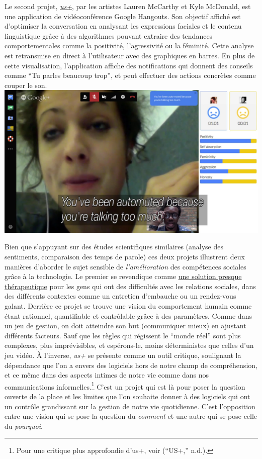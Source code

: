 \documentclass[]{article}
\begin{document}
Le second projet, \href{http://lauren-mccarthy.com/us}{\emph{us+}}, par
les artistes Lauren McCarthy et Kyle McDonald, est une application de
vidéoconférence Google Hangouts. Son objectif affiché est d'optimiser la
conversation en analysant les expressions faciales et le contenu
linguistique grâce à des algorithmes pouvant extraire des tendances
comportementales comme la positivité, l'agressivité ou la féminité.
Cette analyse est retransmise en direct à l'utilisateur avec des
graphiques en barres. En plus de cette visualisation, l'application
affiche des notifications qui donnent des conseils comme ``Tu parles
beaucoup trop'', et peut effectuer des actions concrètes comme couper le
son.
\includegraphics{./tex2pdf.15892/8a1224117ed91d8015226843bec5d97f13330fe4.jpg}

Bien que s'appuyant sur des études scientifiques similaires (analyse des
sentiments, comparaison des temps de parole) ces deux projets illustrent
deux manières d'aborder le sujet sensible de \emph{l'amélioration} des
compétences sociales grâce à la technologie. Le premier se revendique
comme \href{(https://www.youtube.com/watch?v=l3ztu9shfMg)}{une solution
presque thérapeutique} pour les gens qui ont des difficultés avec les
relations sociales, dans des différents contextes comme un entretien
d'embauche ou un rendez-vous galant. Derrière ce projet se trouve une
vision du comportement humain comme étant rationnel, quantifiable et
contrôlable grâce à des paramètres. Comme dans un jeu de gestion, on
doit atteindre son but (communiquer mieux) en ajustant différents
facteurs. Sauf que les règles qui régissent le ``monde réel'' sont plus
complexes, plus imprévisibles, et espérons-le, moins déterministes que
celles d'un jeu vidéo. À l'inverse, \emph{us+} se présente comme un
outil critique, soulignant la dépendance que l'on a envers des logiciels
hors de notre champ de compréhension, et ce même dans des aspects
intimes de notre vie comme dans nos communications
informelles.\footnote{Pour une critique plus approfondie d'us+, voir
  (``US+,'' n.d.).} C'est un projet qui est là pour poser la question
ouverte de la place et les limites que l'on souhaite donner à des
logiciels qui ont un contrôle grandissant sur la gestion de notre vie
quotidienne. C'est l'opposition entre une vision qui se pose la question
du \emph{comment} et une autre qui se pose celle du \emph{pourquoi}.
\end{document}
